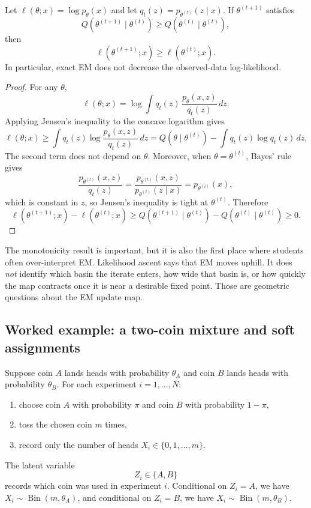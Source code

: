 \documentclass[11pt]{article}
\begin{document}
\begin{proposition}[EM monotonicity]
\label{prop:em-monotonicity}
Let $\ell(\theta;x)=\log p_\theta(x)$ and let $q_t(z)=p_{\theta^{(t)}}(z\mid x)$.
If $\theta^{(t+1)}$ satisfies
\[
Q(\theta^{(t+1)}\mid \theta^{(t)}) \ge Q(\theta^{(t)}\mid \theta^{(t)}),
\]
then
\[
  \ell(\theta^{(t+1)};x) \ge \ell(\theta^{(t)};x).
\]
In particular, exact EM does not decrease the observed-data log-likelihood.
\end{proposition}

\begin{proof}
For any $\theta$,
\[
\ell(\theta;x)
=
\log \int q_t(z)\,\frac{p_\theta(x,z)}{q_t(z)}\,dz.
\]
Applying Jensen's inequality to the concave logarithm gives
\[
\ell(\theta;x)
\ge
\int q_t(z)\log \frac{p_\theta(x,z)}{q_t(z)}\,dz
=
Q(\theta\mid \theta^{(t)}) - \int q_t(z)\log q_t(z)\,dz.
\]
The second term does not depend on $\theta$.
Moreover, when $\theta=\theta^{(t)}$, Bayes' rule gives
\[
\frac{p_{\theta^{(t)}}(x,z)}{q_t(z)}
=
\frac{p_{\theta^{(t)}}(x,z)}{p_{\theta^{(t)}}(z\mid x)}
=
p_{\theta^{(t)}}(x),
\]
which is constant in $z$, so Jensen's inequality is tight at $\theta^{(t)}$.
Therefore
\[
\ell(\theta^{(t+1)};x) - \ell(\theta^{(t)};x)
\ge
Q(\theta^{(t+1)}\mid \theta^{(t)}) - Q(\theta^{(t)}\mid \theta^{(t)})
\ge 0.
\]
\end{proof}

The monotonicity result is important, but it is also the first place where students often over-interpret EM.
Likelihood ascent says that EM moves uphill.
It does \emph{not} identify which basin the iterate enters, how wide that basin is, or how quickly the map contracts once it is near a desirable fixed point.
Those are geometric questions about the EM update map.

\subsection{Worked example: a two-coin mixture and soft assignments}
\label{subsec:em-two-coins}

Suppose coin $A$ lands heads with probability $\theta_A$ and coin $B$ lands heads with probability $\theta_B$.
For each experiment $i=1,\dots,N$:
\begin{enumerate}[leftmargin=*]
  \item choose coin $A$ with probability $\pi$ and coin $B$ with probability $1-\pi$,
  \item toss the chosen coin $m$ times,
  \item record only the number of heads $X_i\in\{0,1,\dots,m\}$.
\end{enumerate}
The latent variable
\[
Z_i\in\{A,B\}
\]
records which coin was used in experiment $i$.
Conditional on $Z_i=A$, we have $X_i\sim\operatorname{Bin}(m,\theta_A)$, and conditional on $Z_i=B$, we have $X_i\sim\operatorname{Bin}(m,\theta_B)$.
\end{document}

